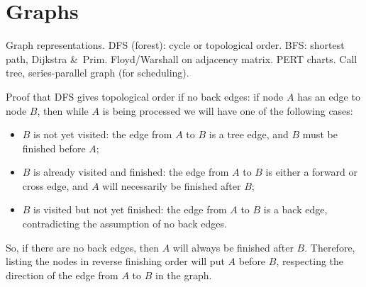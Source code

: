 
\section{Graphs}
Graph representations.
DFS (forest): cycle or topological order. BFS: shortest path, Dijkstra \&\ Prim. Floyd/Warshall on adjacency matrix. PERT charts. Call tree, series-parallel graph (for scheduling).

Proof that DFS gives topological order if no back edges: if node $A$ has an edge to node $B$, then while $A$ is being processed we will have one of the following cases:
\begin{itemize}
\item $B$ is not yet visited: the edge from $A$ to $B$ is a tree edge, and $B$ must be finished before $A$;
\item $B$ is already visited and finished: the edge from $A$ to $B$ is either a forward or cross edge, and $A$ will necessarily be finished after $B$;
\item $B$ is visited but not yet finished: the edge from $A$ to $B$ is a back edge, contradicting the assumption of no back edges.
\end{itemize}
So, if there are no back edges, then $A$ will always be finished after $B$. Therefore, listing the nodes in reverse finishing order will put $A$ before $B$, respecting the direction of the edge from $A$ to $B$ in the graph.